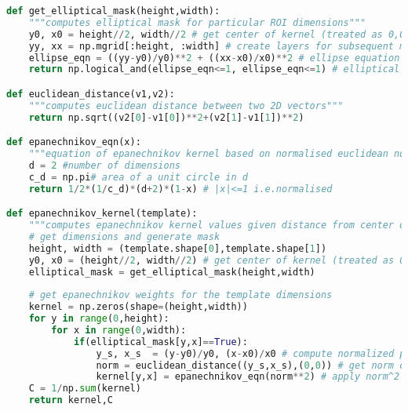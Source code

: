 \begin{lstlisting}[language=Python, caption={Additional functions for Mean Shift Tracker Impementation}, captionpos=b, label={lst:support_MS}]
def get_elliptical_mask(height,width):
    """computes elliptical mask for particular ROI dimensions"""
    y0, x0 = height//2, width//2 # get center of kernel (treated as 0,0) - note these are also hy and hx 
    yy, xx = np.mgrid[:height, :width] # create layers for subsequent mask
    ellipse_eqn = ((yy-y0)/y0)**2 + ((xx-x0)/x0)**2 # ellipse equation
    return np.logical_and(ellipse_eqn<=1, ellipse_eqn<=1) # elliptical mask for kernel

def euclidean_distance(v1,v2):
    """computes euclidean distance between two 2D vectors"""
    return np.sqrt((v2[0]-v1[0])**2+(v2[1]-v1[1])**2)

def epanechnikov_eqn(x):
    """equation of epanechnikov kernel based on normalised euclidean norm squared"""
    d = 2 #number of dimensions
    c_d = np.pi# area of a unit circle in d  
    return 1/2*(1/c_d)*(d+2)*(1-x) # |x|<=1 i.e.normalised

def epanechnikov_kernel(template):
    """computes epanechnikov kernel values given distance from center of kernel"""    
    # get dimensions and generate mask
    height, width = (template.shape[0],template.shape[1])
    y0, x0 = (height//2, width//2) # get center of kernel (treated as 0,0) - note these are also hy and hx 
    elliptical_mask = get_elliptical_mask(height,width) 
    
    # get epanechnikov weights for the template dimensions
    kernel = np.zeros(shape=(height,width)) 
    for y in range(0,height):
        for x in range(0,width):
            if(elliptical_mask[y,x]==True):
                y_s, x_s  = (y-y0)/y0, (x-x0)/x0 # compute normalized point 
                norm = euclidean_distance((y_s,x_s),(0,0)) # get norm of normalized point (x_i*) i.e y0=hy, x0=hx
                kernel[y,x] = epanechnikov_eqn(norm**2) # apply norm^2 to epanechnikov equation
    C = 1/np.sum(kernel)
    return kernel,C
\end{lstlisting}
\newpage
